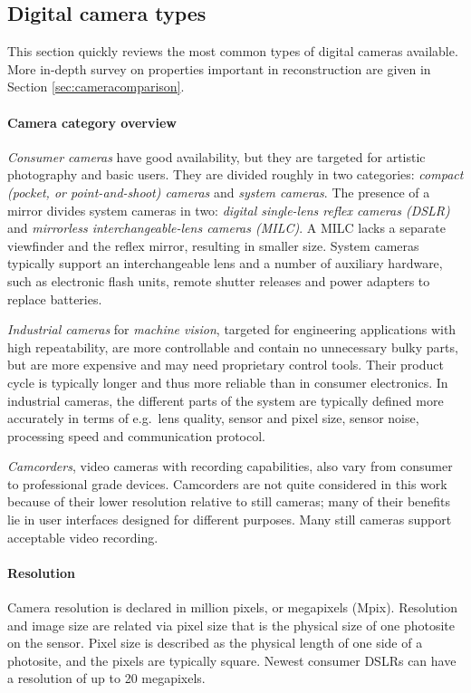 \subsection{Digital camera types} \label{sec:cameratypes} %


This section quickly reviews the most common types of digital cameras available.
More in-depth survey on properties important in reconstruction are given in Section \ref{sec:cameracomparison}.
%

\paragraph{Camera category overview}
\emph{Consumer cameras} have good availability, but they are targeted for artistic photography and basic users.
They are divided roughly in two categories: \emph{compact (pocket, or point-and-shoot) cameras} and \emph{system cameras}.
The presence of a mirror divides system cameras in two: \emph{digital single-lens reflex cameras (DSLR)} and \emph{mirrorless interchangeable-lens cameras (MILC)}.
A MILC lacks a separate viewfinder and the reflex mirror, resulting in smaller size.
System cameras typically support an interchangeable lens and a number of auxiliary hardware, such as electronic flash units, remote shutter releases and power adapters to replace batteries.

\emph{Industrial cameras} for \emph{machine vision}, targeted for engineering applications with high repeatability, are more controllable and contain no unnecessary bulky parts, but are more expensive and may need proprietary control tools.
Their product cycle is typically longer and thus more reliable than in consumer electronics.
In industrial cameras, the different parts of the system are typically defined more accurately in terms of e.g.\ lens quality, sensor and pixel size, sensor noise, processing speed and communication protocol.

\emph{Camcorders}, video cameras with recording capabilities, also vary from consumer to professional grade devices.
Camcorders are not quite considered in this work because of their lower resolution relative to still cameras; many of their benefits lie in user interfaces designed for different purposes.
Many still cameras support acceptable video recording.


\paragraph{Resolution}
Camera resolution is declared in million pixels, or megapixels (Mpix).
Resolution and image size are related via pixel size that is the physical size of one photosite on the sensor.
Pixel size is described as the physical length of one side of a photosite, and the pixels are typically square.
Newest consumer DSLRs can have a resolution of up to 20 megapixels.

